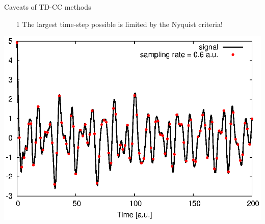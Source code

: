 \documentclass{beamer}
\begin{document}
\begin{frame}{Caveats of TD-CC methods}
\begin{enumerate}
\item[1]{The largest time-step possible is limited by the Nyquist criteria!}
\end{enumerate}
\begin{center}
  \includegraphics[scale=0.8]{figures/nyquist3.eps}
\end{center}
\end{frame}
\end{document}
